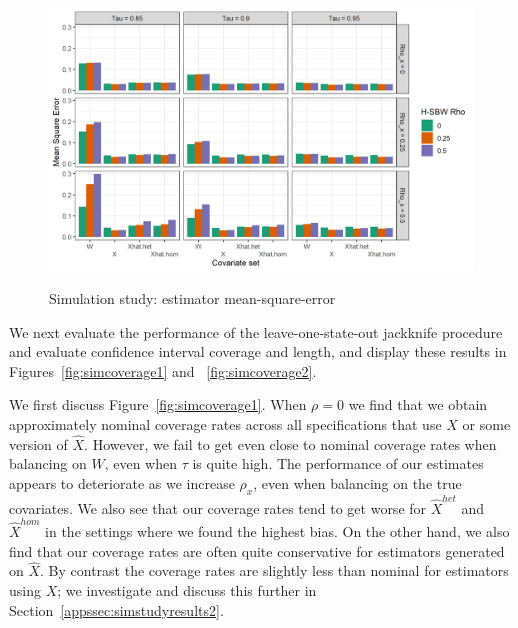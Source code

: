\begin{figure}[H]
\begin{center}
    \caption{Simulation study: estimator mean-square-error}\label{fig:simmse}
    \label{fig:loveplotc1}
    \includegraphics[scale=0.5]{01_Plots/mse-plot.png}
\end{center}
\end{figure}

We next evaluate the performance of the leave-one-state-out jackknife procedure and evaluate confidence interval coverage and length, and display these results in Figures~\ref{fig:simcoverage1} and ~\ref{fig:simcoverage2}. 

We first discuss Figure~\ref{fig:simcoverage1}. When $\rho = 0$ we find that we obtain approximately nominal coverage rates across all specifications that use $X$ or some version of $\hat{X}$. However, we fail to get even close to nominal coverage rates when balancing on $W$, even when $\tau$ is quite high. The performance of our estimates appears to deteriorate as we increase $\rho_x$, even when balancing on the true covariates. We also see that our coverage rates tend to get worse for $\hat{X}^{het}$ and $\hat{X}^{hom}$ in the settings where we found the highest bias. On the other hand, we also find that our coverage rates are often quite conservative for estimators generated on $\hat{X}$. By contrast the coverage rates are slightly less than nominal for estimators using $X$; we investigate and discuss this further in Section~\ref{appssec:simstudyresults2}. 

